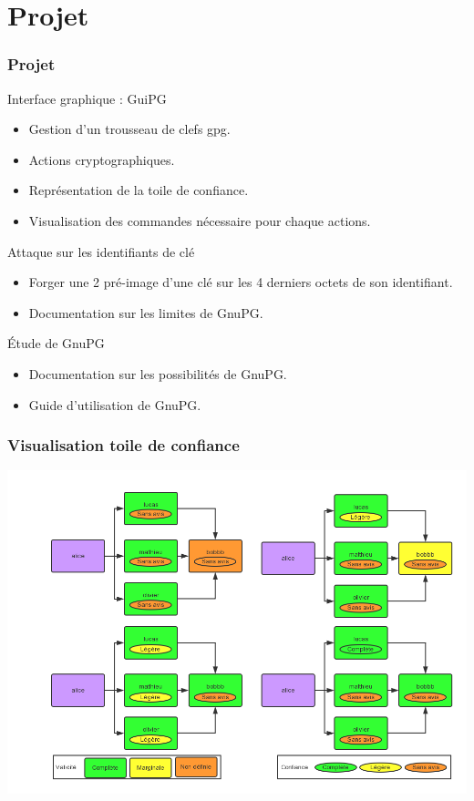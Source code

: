 \section{Projet}
\begin{frame}
    \frametitle{\color{white}Projet}
    \begin{exampleblock}{Interface graphique : GuiPG}
      \begin{itemize}
        \item Gestion d'un trousseau de clefs gpg.
        \item Actions cryptographiques.
        \item Représentation de la toile de confiance.
        \item Visualisation des commandes nécessaire pour chaque actions.
      \end{itemize}
    \end{exampleblock}
\pause
    \begin{block}{Attaque sur les identifiants de clé}
      \begin{itemize}
        \item Forger une 2 pré-image d'une clé sur les 4 derniers octets de son identifiant.
        \item Documentation sur les limites de GnuPG.
      \end{itemize}
    \end{block}
    \pause
    \begin{alertblock}{Étude de GnuPG}
    \begin{itemize}
      \item Documentation sur les possibilités de GnuPG.
      \item Guide d'utilisation de GnuPG.
    \end{itemize}
    \end{alertblock}  
\end{frame}

\begin{frame}
  \frametitle{\color{white}Visualisation toile de confiance}
    \includegraphics[scale=0.3]{tdcdemo.png}
\end{frame}

